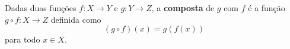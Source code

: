 \begin{definition}
	Dadas duas funções $f\colon X\to Y$ e $g\colon Y\to Z$, a \textbf{composta} de $g$ com $f$ é a função $g\circ f\colon X\to Z$ definida como
	\[(g\circ f)(x)=g(f(x))\]
	para todo $x\in X$.
\end{definition}